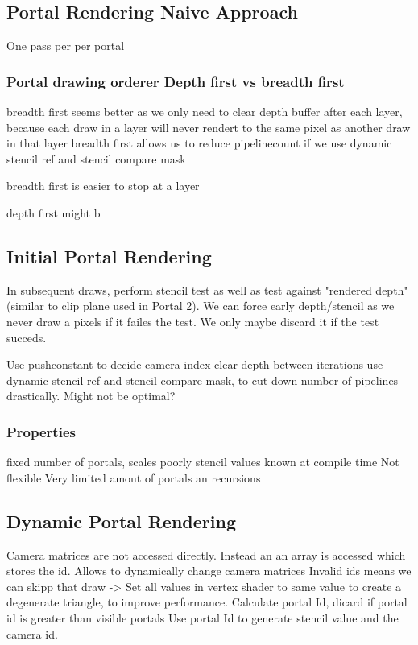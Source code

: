 \subsection{Portal Rendering Naive Approach}
One pass per per portal

\subsubsection{Portal drawing orderer Depth first vs breadth first}

breadth first seems better as we only need to clear depth buffer after each layer, because
each draw in a layer will never rendert to the same pixel as another draw in that layer
breadth first allows us to reduce pipelinecount if we use dynamic stencil ref and stencil compare mask

breadth first is easier to stop at a layer

depth first might b

\subsection{Initial Portal Rendering}
In subsequent draws, perform stencil test as well as test against "rendered depth" (similar to clip plane used in Portal 2).
We can force early depth/stencil as we never draw a pixels if it failes the test. We only maybe discard it if the test succeds.

Use pushconstant to decide camera index
clear depth between iterations
use dynamic stencil ref and stencil compare mask, to cut down number of pipelines drastically. Might not be optimal?


\subsubsection{Properties}
fixed number of portals, scales poorly
stencil values known at compile time
Not flexible
Very limited amout of portals an recursions

\subsection{Dynamic Portal Rendering}
Camera matrices are not accessed directly. Instead an an array is accessed which stores the id. Allows to dynamically change camera matrices
Invalid ids means we can skipp that draw -> Set all values in vertex shader to same value to create a degenerate triangle, to improve performance.
Calculate portal Id, dicard if portal id is greater than visible portals
Use portal Id to generate stencil value and the camera id.


